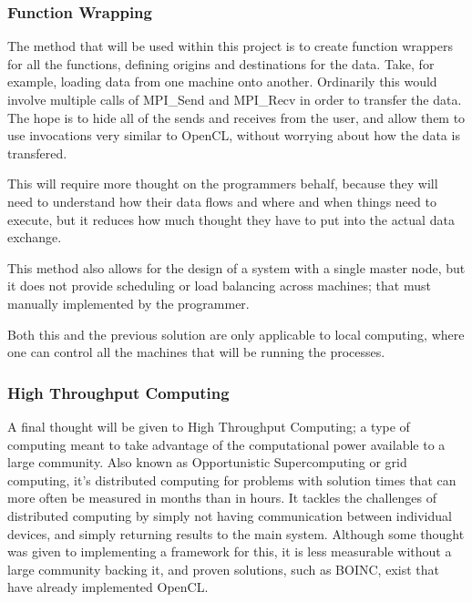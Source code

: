 \documentclass[../thesis.tex]{subfiles}
\begin{document}
        \subsubsection{Function Wrapping} %
        \label{ssub:function_wrapping}
            The method that will be used within this project is to create function wrappers for all the functions, defining origins and destinations for the data. Take, for example, loading data from one machine onto another. Ordinarily this would involve multiple calls of MPI\_Send and MPI\_Recv in order to transfer the data. The hope is to hide all of the sends and receives from the user, and allow them to use invocations very similar to OpenCL, without worrying about how the data is transfered.

            This will require more thought on the programmers behalf, because they will need to understand how their data flows and where and when things need to execute, but it reduces how much thought they have to put into the actual data exchange.

            This method also allows for the design of a system with a single master node, but it does not provide scheduling or load balancing across machines; that must manually implemented by the programmer.

            Both this and the previous solution are only applicable to local computing, where one can control all the machines that will be running the processes.
        \subsubsection{High Throughput Computing} %
        \label{ssub:high_throughput_computing}
            A final thought will be given to High Throughput Computing; a type of computing meant to take advantage of the computational power available to a large community. Also known as Opportunistic Supercomputing or grid computing, it's distributed computing for problems with solution times that can more often be measured in months than in hours. It tackles the challenges of distributed computing by simply not having communication between individual devices, and simply returning results to the main system. Although some thought was given to implementing a framework for this, it is less measurable without a large community backing it, and proven solutions, such as BOINC, exist that have already implemented OpenCL\cite{boinc}. 
\end{document}
